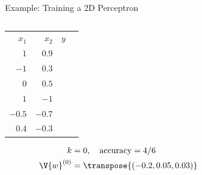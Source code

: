 \documentclass[9pt]{beamer}
\begin{document}
\begin{frame}{Example: Training a 2D Perceptron}
\begin{columns}
\begin{column}{0.6\textwidth}
	\begin{center}
		\begin{tabular}{rrrl}
			\toprule
			$x_1$ & $x_2$ & $y$ \\
			\cmidrule{1-3}
			$1$ & $0.9$ & \hi \\
		     $-1$ & $0.3$ & \hi \\
		     $0$ & $0.5$ & \hi \\
		     $1$ & $-1$ & \lo \\
		     $-0.5$ & $-0.7$ & \lo \\
		     $0.4$ & $-0.3$	& \lo \\
		    \bottomrule
		\end{tabular}

		\begin{align*}
			k &= 0,\quad\text{accuracy} = 4/6 \\
			\V{w}^{(0)} &= \transpose{(-0.2, 0.05, 0.03)} \\
		\end{align*}
	\end{center}
\end{column}

\begin{column}{0.4\textwidth}
	\begin{center}
	\end{center}
\end{column}
\end{columns}
\end{frame}
\end{document}
